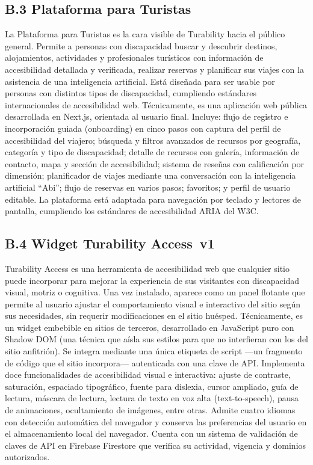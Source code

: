 \documentclass[12pt,a4paper]{article}
\begin{document}
\subsection*{B.3 Plataforma para Turistas}

La Plataforma para Turistas es la cara visible de Turability hacia el público general. Permite a personas con discapacidad buscar y descubrir destinos, alojamientos, actividades y profesionales turísticos con información de accesibilidad detallada y verificada, realizar reservas y planificar sus viajes con la asistencia de una inteligencia artificial. Está diseñada para ser usable por personas con distintos tipos de discapacidad, cumpliendo estándares internacionales de accesibilidad web. Técnicamente, es una aplicación web pública desarrollada en Next.js, orientada al usuario final. Incluye: flujo de
registro e incorporación guiada (onboarding) en cinco pasos con captura del perfil de accesibilidad del viajero;
búsqueda y filtros avanzados de recursos por geografía, categoría y tipo de discapacidad;
detalle de recursos con galería, información de contacto, mapa y sección de accesibilidad;
sistema de reseñas con calificación por dimensión; planificador de viajes mediante una conversación con
la inteligencia artificial ``Abi''; flujo de reservas en varios pasos; favoritos; y perfil de usuario editable. La
plataforma está adaptada para navegación por teclado y lectores de pantalla, cumpliendo
los estándares de accesibilidad ARIA del W3C.

\subsection*{B.4 Widget Turability Access~v1}

Turability Access es una herramienta de accesibilidad web que cualquier sitio puede incorporar para mejorar la experiencia de sus visitantes con discapacidad visual, motriz o cognitiva. Una vez instalado, aparece como un panel flotante que permite al usuario ajustar el comportamiento visual e interactivo del sitio según sus necesidades, sin requerir modificaciones en el sitio huésped. Técnicamente, es un widget embebible en sitios de terceros, desarrollado en JavaScript
puro con Shadow DOM (una técnica que aísla sus estilos para que no interfieran con los del sitio anfitrión). Se integra mediante una única etiqueta de
script —un fragmento de código que el sitio incorpora— autenticada con una clave de API. Implementa doce funcionalidades de accesibilidad
visual e interactiva: ajuste de contraste, saturación, espaciado tipográfico, fuente para
dislexia, cursor ampliado, guía de lectura, máscara de lectura, lectura de texto en voz alta (text-to-speech), pausa de
animaciones, ocultamiento de imágenes, entre otras. Admite cuatro idiomas con detección
automática del navegador y conserva las preferencias del usuario en el almacenamiento local del navegador.
Cuenta con un sistema de validación de claves de API en Firebase Firestore que verifica su actividad,
vigencia y dominios autorizados.
\end{document}
